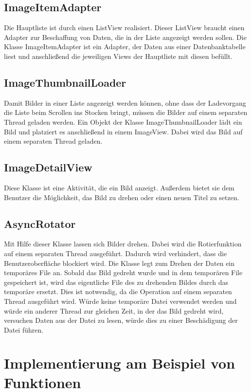 \subsection{ImageItemAdapter}
Die Hauptliste ist durch einen ListView realisiert.
Dieser ListView braucht einen Adapter zur Beschaffung von Daten, die in der Liste angezeigt werden sollen.
Die Klasse ImageItemAdapter ist ein Adapter, der Daten aus einer Datenbanktabelle liest
und anschließend die jeweiligen Views der Hauptliste mit diesen befüllt.

\subsection{ImageThumbnailLoader}
Damit Bilder in einer Liste angezeigt werden können,
ohne dass der Ladevorgang die Liste beim Scrollen ins Stocken bringt, 
müssen die Bilder auf einem separaten Thread geladen werden.
Ein Objekt der Klasse ImageThumbnailLoader lädt ein Bild und platziert es anschließend
in einem ImageView.
Dabei wird das Bild auf einem separaten Thread geladen. 

\subsection{ImageDetailView}
Diese Klasse ist eine Aktivität, die ein Bild anzeigt. 
Außerdem bietet sie dem Benutzer die Möglichkeit, das Bild zu drehen oder einen neuen Titel zu setzen.

\subsection{AsyncRotator}
Mit Hilfe dieser Klasse lassen sich Bilder drehen. 
Dabei wird die Rotierfunktion auf einem separaten Thread ausgeführt.
Dadurch wird verhindert, dass die Benutzeroberfläche blockiert wird.
Die Klasse legt zum Drehen der Daten ein temporäres File an.
Sobald das Bild gedreht wurde und in dem temporären File gespeichert ist, 
wird das eigentliche File des zu drehenden Bildes durch das temporäre ersetzt.
Dies ist notwendig, da die Operation auf einem separaten Thread ausgeführt wird.
Würde keine temporäre Datei verwendet werden und würde ein anderer Thread 
zur gleichen Zeit, in der das Bild gedreht wird, versuchen Daten aus der Datei zu lesen,
würde dies zu einer Beschädigung der Datei führen.

\section{Implementierung am Beispiel von Funktionen}

